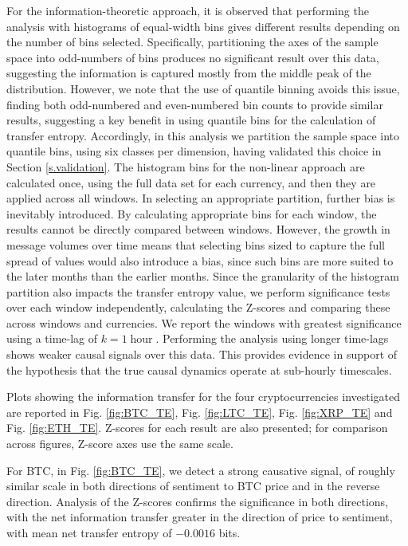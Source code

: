\documentclass[]{rsos}%
\begin{document}
  For the information-theoretic approach, it is observed that performing the analysis with histograms of equal-width bins gives different results depending on the number of bins selected. Specifically, partitioning the axes of the sample space into odd-numbers of bins produces no significant result over this data, suggesting the information is captured mostly from the middle peak of the distribution. However, we note that the use of quantile binning avoids this issue, finding both odd-numbered and even-numbered bin counts to provide similar results, suggesting a key benefit in using quantile bins for the calculation of transfer entropy. Accordingly, in this analysis we partition the sample space into quantile bins, using six classes per dimension, having validated this choice in Section \ref{s.validation}. The histogram bins for the non-linear approach are calculated once, using the full data set for each currency, and then they are applied across all windows. In selecting an appropriate partition, further bias is inevitably introduced. By calculating appropriate bins for each window, the results cannot be directly compared between windows. However, the growth in message volumes over time means that selecting bins sized to capture the full spread of values would also introduce a bias, since such bins are more suited to the later months than the earlier months. Since the granularity of the histogram partition also impacts the transfer entropy value, we perform significance tests over each window independently, calculating the Z-scores and comparing these across windows and currencies.  We report the windows with greatest significance using a time-lag of $k=1\operatorname{hour}$. Performing the analysis using longer time-lags shows weaker causal signals over this data. This provides evidence in support of the hypothesis that the true causal dynamics operate at sub-hourly timescales.

  Plots showing the information transfer for the four cryptocurrencies investigated are reported in Fig. \ref{fig:BTC_TE}, Fig. \ref{fig:LTC_TE}, Fig. \ref{fig:XRP_TE} and Fig. \ref{fig:ETH_TE}. Z-scores for each result are also presented; for comparison across figures, Z-score axes  use the same scale.
  
  For BTC, in Fig. \ref{fig:BTC_TE}, we detect a strong causative signal, of roughly similar scale in both directions of sentiment to BTC price and in the reverse direction. Analysis of the Z-scores confirms the significance in both directions, with the net information transfer greater in the direction of price to sentiment, with mean net transfer entropy of $-0.0016$ bits.
  
\end{document}
